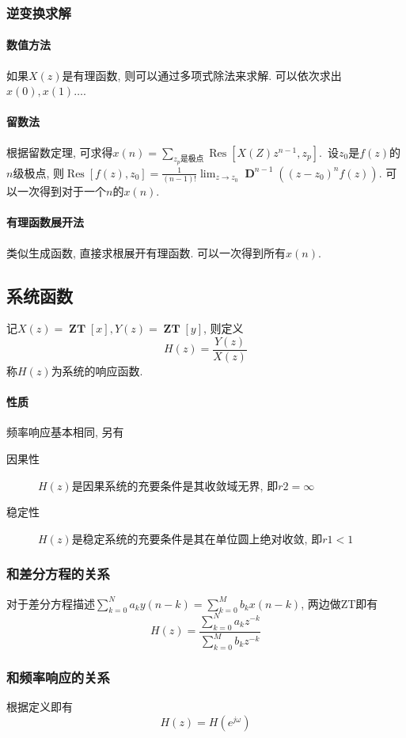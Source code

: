 \documentclass{ctexart}
\DeclareMathOperator{\ZT}{\mathbf{ZT}}
\DeclareMathOperator{\D}{\mathbf{D}}
\DeclareMathOperator{\Res}{\mathrm{Res}}
\begin{document}
\subsubsection{逆变换求解}
\paragraph{数值方法} 如果$X(z)$是有理函数, 则可以通过多项式除法来求解. 可以依次求出$x(0), x(1) \ldots$.
\paragraph{留数法} 根据留数定理, 可求得$x(n) = \sum_{z_p\text{是极点}} \Res\left[X(Z) z^{n - 1}, z_p\right]$.\
    设$z_0$是$f(z)$的$n$级极点, 则$\Res[f(z), z_0] = \frac{1}{(n-1)!} \lim_{z \to z_0} \D^{n-1} \left( (z - z_0)^n f(z) \right)$.
    可以一次得到对于一个$n$的$x(n)$.
\paragraph{有理函数展开法} 类似生成函数, 直接求根展开有理函数. 可以一次得到所有$x(n)$.

\subsection{系统函数}
    记$X(z) = \ZT[x], Y(z) = \ZT[y]$, 则定义\[H(z) = \frac{Y(z)}{X(z)}\]称$H(z)$为系统的响应函数.\par
\paragraph{性质} 频率响应基本相同, 另有\begin{description}
        \item[因果性] $H(z)$是因果系统的充要条件是其收敛域无界, 即$r2 = \infty$
        \item[稳定性] $H(z)$是稳定系统的充要条件是其在单位圆上绝对收敛, 即$r1 < 1$
    \end{description}
\subsubsection{和差分方程的关系}
    对于差分方程描述$\sum_{k = 0}^N a_k y(n - k) = \sum_{k = 0}^M b_k x(n - k)$, 两边做ZT即有
    \[
        H(z) = \frac{\sum_{k = 0}^N a_k z^{-k}} { \sum_{k = 0}^M b_k z^{-k}} \]
\subsubsection{和频率响应的关系}
    根据定义即有\[
        H(z) = H(e^{j\omega})\]
\end{document}
